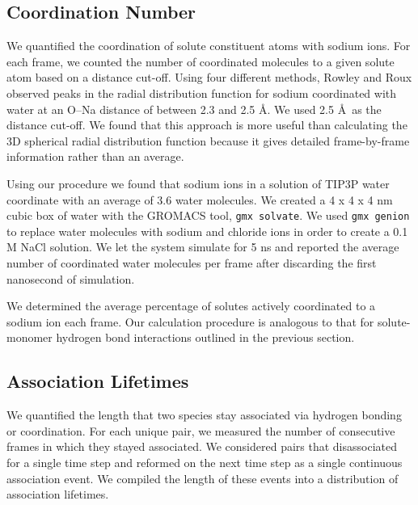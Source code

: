 \documentclass[journal=jpcbfk,manuscript=article]{achemso}
\begin{document}
  \subsection{Coordination Number}\label{method:coordination}

  We quantified the coordination of solute constituent atoms with sodium ions.
  For each frame, we counted the number of coordinated molecules to a
  given solute atom based on a distance cut-off. Using four different methods,
  Rowley and Roux observed peaks in the radial distribution function for sodium
  coordinated with water at an O--Na distance of between 2.3 and 2.5 \AA.
  \cite{rowley_solvation_2012} We used 2.5 \AA~as the distance cut-off. We 
  found that this approach is more useful than calculating the 3D spherical
  radial distribution function because it gives detailed frame-by-frame 
  information rather than an average. 
  
  Using our procedure we found that sodium ions in a solution of TIP3P water
  coordinate with an average of 3.6 water molecules. We created a 4 x 4 x 4
  nm cubic box of water with the GROMACS tool, \texttt{gmx solvate}. We used
  \texttt{gmx genion} to replace water molecules with sodium and chloride 
  ions in order to create a 0.1 M NaCl solution. We let the system simulate
  for 5 ns and reported the average number of coordinated water molecules 
  per frame after discarding the first nanosecond of simulation.
  
  We determined the average percentage of solutes actively coordinated to
  a sodium ion each frame. Our calculation procedure is analogous to that for
  solute-monomer hydrogen bond interactions outlined in the previous section.
  
  \subsection{Association Lifetimes}\label{method:lifetimes}
  
  We quantified the length that two species stay associated via hydrogen
  bonding or coordination. For each unique pair, we measured the number of 
  consecutive frames in which they stayed associated. We considered pairs
  that disassociated for a single time step and reformed on the next time
  step as a single continuous association event. We compiled the length 
  of these events into a distribution of association lifetimes.
  
\end{document}
